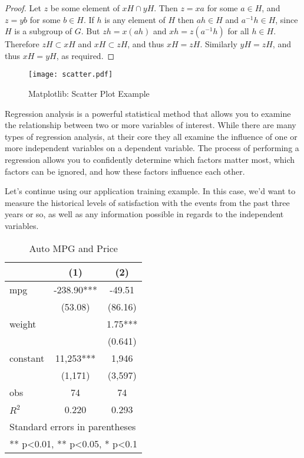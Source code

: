 \documentclass[fancy,blue,11pt]{elegantbook}
\begin{document}
\begin{proof}
Let $z$ be some element of $xH \cap yH$.  Then $z = xa$ for some $a \in H$, and $z = yb$ for some $b \in H$. If $h$ is any element of $H$ then $ah \in H$ and $a^{-1}h \in H$, since $H$ is a subgroup of $G$. But $zh = x(ah)$ and $xh = z(a^{-1}h)$ for all $h \in H$. Therefore $zH \subset xH$ and $xH \subset zH$, and thus $xH = zH$.  Similarly $yH = zH$, and thus $xH = yH$, as required.
\end{proof}

\begin{figure}[htbp]
	\centering
	\texttt{[image: scatter.pdf]}
	\caption{Matplotlib: Scatter Plot Example\label{fig:scatter}}
\end{figure}

Regression analysis is a powerful statistical method that allows you to examine the relationship between two or more variables of interest. While there are many types of regression analysis, at their core they all examine the influence of one or more independent variables on a dependent variable. The process of performing a regression allows you to confidently determine which factors matter most, which factors can be ignored, and how these factors influence each other.

Let's continue using our application training example. In this case, we'd want to measure the historical levels of satisfaction with the events from the past three years or so, as well as any information possible in regards to the independent variables. 


\begin{table}[htbp]
  \small
  \centering
  \caption{Auto MPG and Price \label{tab:reg}}
    \begin{tabular}{lcc}
    \toprule
                    &       (1)         &        (2)      \\
    \midrule
    mpg             &    -238.90***     &      -49.51     \\
                    &     (53.08)       &      (86.16)    \\
    weight          &                   &      1.75***    \\
                    &                   &      (0.641)    \\
    constant        &     11,253***     &       1,946     \\
                    &     (1,171)       &      (3,597)   \\
    obs             &        74         &         74     \\
    $R^2$           &      0.220        &       0.293    \\
    \bottomrule
    \multicolumn{3}{l}{\scriptsize Standard errors in parentheses} \\
    \multicolumn{3}{l}{\scriptsize *** p<0.01, ** p<0.05, * p<0.1} \\
    \end{tabular}%
\end{table}%
\end{document}
